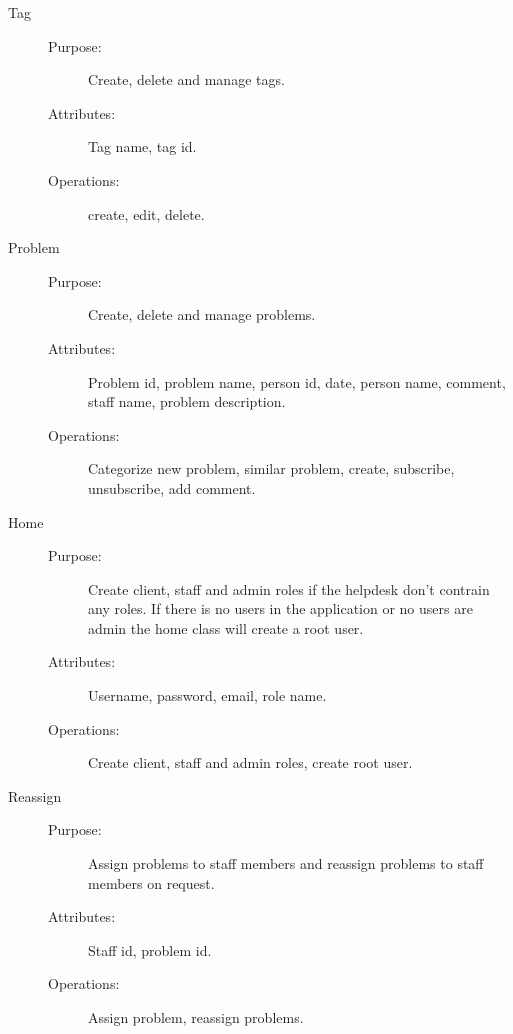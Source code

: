 \begin{description}
\item[Tag]\hfill
\begin{description}
\item[Purpose:]Create, delete and manage tags.
\item[Attributes:]Tag name, tag id.
\item[Operations:]create, edit, delete.
\end{description}
\end{description}

\begin{description}
\item[Problem]\hfill
\begin{description}
\item[Purpose:]Create, delete and manage problems.
\item[Attributes:]Problem id, problem name, person id, date, person name, comment, staff name, problem description.
\item[Operations:]Categorize new problem, similar problem, create, subscribe, unsubscribe, add comment.
\end{description}
\end{description}

\begin{description}
\item[Home]\hfill
\begin{description}
\item[Purpose:]Create client, staff and admin roles if the helpdesk don't contrain any roles. If there is no users in the application or no users are admin the home class will create a root user.
\item[Attributes:]Username, password, email, role name.
\item[Operations:]Create client, staff and admin roles, create root user.
\end{description}
\end{description}

\begin{description}
\item[Reassign]\hfill
\begin{description}
\item[Purpose:]Assign problems to staff members and reassign problems to staff members on request.
\item[Attributes:]Staff id, problem id.
\item[Operations:]Assign problem, reassign problems.
\end{description}
\end{description}

